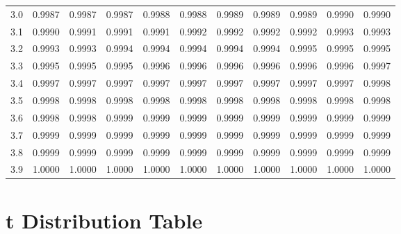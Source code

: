 \begin{center}
\begin{tabular}{|l|*{10}{r}|}
3.0 &  0.9987 &  0.9987 &  0.9987 &  0.9988 &  0.9988 &  0.9989 &  0.9989 &  0.9989 &  0.9990 &  0.9990\\ 
3.1 &  0.9990 &  0.9991 &  0.9991 &  0.9991 &  0.9992 &  0.9992 &  0.9992 &  0.9992 &  0.9993 &  0.9993\\ 
3.2 &  0.9993 &  0.9993 &  0.9994 &  0.9994 &  0.9994 &  0.9994 &  0.9994 &  0.9995 &  0.9995 &  0.9995\\ 
3.3 &  0.9995 &  0.9995 &  0.9995 &  0.9996 &  0.9996 &  0.9996 &  0.9996 &  0.9996 &  0.9996 &  0.9997\\ 
3.4 &  0.9997 &  0.9997 &  0.9997 &  0.9997 &  0.9997 &  0.9997 &  0.9997 &  0.9997 &  0.9997 &  0.9998\\ 
3.5 &  0.9998 &  0.9998 &  0.9998 &  0.9998 &  0.9998 &  0.9998 &  0.9998 &  0.9998 &  0.9998 &  0.9998\\ 
3.6 &  0.9998 &  0.9998 &  0.9999 &  0.9999 &  0.9999 &  0.9999 &  0.9999 &  0.9999 &  0.9999 &  0.9999\\ 
3.7 &  0.9999 &  0.9999 &  0.9999 &  0.9999 &  0.9999 &  0.9999 &  0.9999 &  0.9999 &  0.9999 &  0.9999\\ 
3.8 &  0.9999 &  0.9999 &  0.9999 &  0.9999 &  0.9999 &  0.9999 &  0.9999 &  0.9999 &  0.9999 &  0.9999\\ 
3.9 &  1.0000 &  1.0000 &  1.0000 &  1.0000 &  1.0000 &  1.0000 &
1.0000 &  1.0000 &  1.0000 &  1.0000\\ 
\hline
\end{tabular}

\end{center}
\newpage
\section{t Distribution Table}
\label{tDistributionTable}

